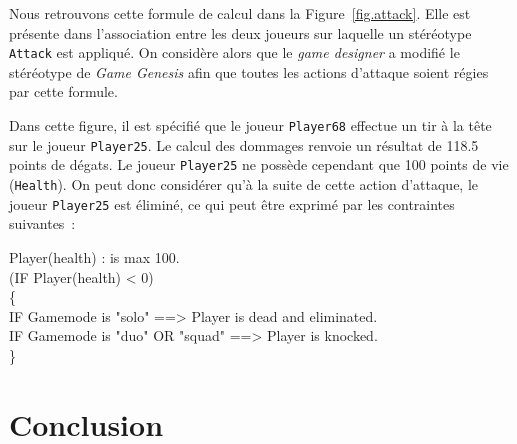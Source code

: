 


Nous retrouvons cette formule de calcul dans la Figure~\ref{fig.attack}.
Elle est présente dans l'association entre les deux joueurs sur laquelle un stéréotype \texttt{Attack} est appliqué.
On considère alors que le \emph{game designer} a modifié le stéréotype de \emph{Game Genesis} afin que toutes les actions d'attaque soient régies par cette formule.

Dans cette figure, il est spécifié que le joueur \texttt{Player68} effectue un tir à la tête sur le joueur \texttt{Player25}.
Le calcul des dommages renvoie un résultat de 118.5 points de dégats.
Le joueur \texttt{Player25} ne possède cependant que 100 points de vie (\texttt{Health}).
On peut donc considérer qu'à la suite de cette action d'attaque, le joueur \texttt{Player25} est éliminé, 
ce qui peut être exprimé par les contraintes suivantes~: 

{
\footnotesize
\begin{framed}
    Player(health) : is max 100.\\
    (IF Player(health) < 0)\\
    \{\\
    IF Gamemode is "solo" ==> Player is dead and eliminated.\\
    IF Gamemode is "duo" OR "squad" ==> Player is knocked.\\
    \}
\end{framed}
}

\section{Conclusion}

